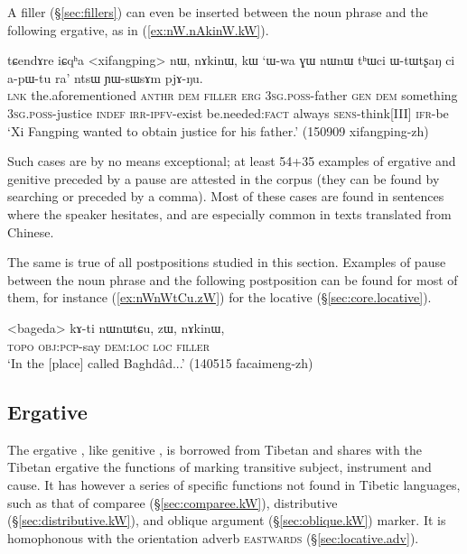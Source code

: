 A filler (§\ref{sec:fillers}) can even be inserted between the noun phrase and the following ergative, as in (\ref{ex:nW.nAkinW.kW}).

\begin{exe}
\ex \label{ex:nW.nAkinW.kW}
\gll  tɕendɤre iɕqʰa <xifangping> nɯ, nɤkinɯ, kɯ `ɯ-wa ɣɯ nɯnɯ tʰɯci ɯ-tɯtʂaŋ ci a-pɯ-tu ra' ntsɯ ɲɯ-sɯsɤm pjɤ-ŋu. \\
\textsc{lnk} the.aforementioned  \textsc{anthr} \textsc{dem} \textsc{filler} \textsc{erg} \textsc{3sg}.\textsc{poss}-father \textsc{gen} \textsc{dem} something \textsc{3sg}.\textsc{poss}-justice \textsc{indef} \textsc{irr}-\textsc{ipfv}-exist be.needed:\textsc{fact} always \textsc{sens}-think[III] \textsc{ifr}-be \\
\glt `Xi Fangping wanted to obtain justice for his father.' (150909 xifangping-zh)
\end{exe}

Such cases are by no means exceptional; at least 54+35 examples of ergative and genitive preceded by a pause are attested in the corpus (they can be found by searching  or   preceded by a comma). Most of these cases are found in sentences where the speaker hesitates, and are especially common in texts translated from Chinese.

The same is true of all postpositions studied in this section. Examples of pause between the noun phrase and the following postposition can be found for most of them, for instance (\ref{ex:nWnWtCu.zW}) for the locative  (§\ref{sec:core.locative}).

\begin{exe}
\ex \label{ex:nWnWtCu.zW}
\gll  <bageda> kɤ-ti nɯnɯtɕu, zɯ, nɤkinɯ, \\
\textsc{topo} \textsc{obj}:\textsc{pcp}-say \textsc{dem}:\textsc{loc} \textsc{loc} \textsc{filler} \\
\glt `In the [place] called Baghdâd...' (140515 facaimeng-zh) 
\end{exe}

\subsection{Ergative} \label{sec:erg.kW}
The ergative , like genitive , is borrowed from Tibetan \citep{jacques16comparative} and shares with the Tibetan ergative the functions of marking transitive subject, instrument and cause. It has however a series of specific functions not found in Tibetic languages, such as that of comparee (§\ref{sec:comparee.kW}), distributive (§\ref{sec:distributive.kW}),  and oblique argument (§\ref{sec:oblique.kW}) marker. It is homophonous with the orientation adverb  \textsc{eastwards} (§\ref{sec:locative.adv}).

